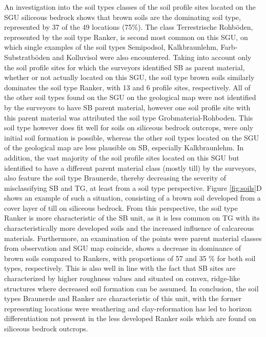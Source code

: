 \documentclass[preprint,12pt,authoryear]{elsarticle}
\begin{document}
An investigation into the soil types classes of the soil profile sites located on the SGU siliceous bedrock shows that brown soils are the dominating soil type, represented by 37 of the 49 locations (75\%). The class Terrestrische Rohb\"oden, represented by the soil type Ranker, is second most common on this SGU, on which single examples of the soil types Semipodsol, Kalkbraunlehm, Farb-Substratb\"oden and Kolluvisol were also encountered. Taking into account only the soil profile sites for which the surveyors identified SB as parent material, whether or not actually located on this SGU, the soil type brown soils similarly dominates the soil type Ranker, with 13 and 6 profile sites, respectively. All of the other soil types found on the SGU on the geological map were not identified by the surveyors to have SB parent material, however one soil profile site with this parent material was attributed the soil type Grobmaterial-Rohboden. This soil type however does fit well for soils on siliceous bedrock outcrops, were only initial soil formation is possible, whereas the other soil types located on the SGU of the geological map are less plausible on SB, especially Kalkbraunlehm. In addition, the vast majority of the soil profile sites located on this SGU but identified to have a different parent material class (mostly till)  by the surveyors, also feature the soil type Braunerde, thereby decreasing the severity of misclassifying SB and TG, at least from a soil type perspective. Figure \ref{fig:soils}D shows an example of such a situation, consisting of a brown soil developed from a cover layer of till on siliceous bedrock. From this perspective, the soil type Ranker is more characteristic of the SB unit, as it is less common on TG with its characteristically more developed soils and the increased influence of  calcareous materials. Furthermore, an examination of the points were parent material classes from observation and SGU map coincide, shows a decrease in dominance of brown soils compared to Rankers, with proportions of 57 and 35 \% for both soil types, respectively. This is also well in line with the fact that SB sites are characterized by higher roughness values and situated on convex, ridge-like structures where decreased soil formation can be assumed. In conclusion, the soil types Braunerde and Ranker are characteristic of this unit, with the former representing locations were weathering and clay-reformation has led to horizon differentiation not present in the less developed Ranker soils which are found on siliceous bedrock outcrops.
\end{document}
